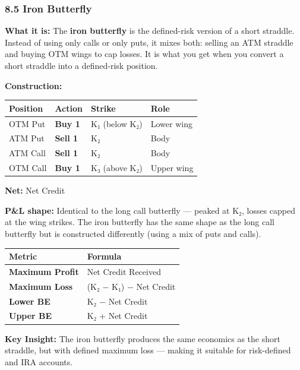 \documentclass[12pt,openany]{book}
\begin{document}
\subsubsection{8.5 Iron Butterfly}

\textbf{What it is:} The \textbf{iron butterfly} is the defined-risk version of a short straddle. Instead of using only calls or only puts, it mixes both: selling an ATM straddle and buying OTM wings to cap losses. It is what you get when you convert a short straddle into a defined-risk position.

\textbf{Construction:}

\begin{center}
\scriptsize
\setlength{\tabcolsep}{3pt}
\begin{tabular}{|L{3.31cm}|L{3.31cm}|L{3.31cm}|L{3.31cm}|}
\hline
Position & Action & Strike & Role \\
\hline
OTM Put & \textbf{Buy 1} & K₁ (below K₂) & Lower wing \\
\hline
ATM Put & \textbf{Sell 1} & K₂ & Body \\
\hline
ATM Call & \textbf{Sell 1} & K₂ & Body \\
\hline
OTM Call & \textbf{Buy 1} & K₃ (above K₂) & Upper wing \\
\hline
\end{tabular}
\end{center}

\textbf{Net:} Net Credit

\textbf{P\&L shape:} Identical to the long call butterfly — peaked at K₂, losses capped at the wing strikes. The iron butterfly has the same shape as the long call butterfly but is constructed differently (using a mix of puts and calls).

\begin{center}
\scriptsize
\setlength{\tabcolsep}{3pt}
\begin{tabular}{|L{6.00cm}|L{6.00cm}|}
\hline
Metric & Formula \\
\hline
\textbf{Maximum Profit} & Net Credit Received \\
\hline
\textbf{Maximum Loss} & (K₂ − K₁) − Net Credit \\
\hline
\textbf{Lower BE} & K₂ − Net Credit \\
\hline
\textbf{Upper BE} & K₂ + Net Credit \\
\hline
\end{tabular}
\end{center}

\textbf{Key Insight:} The iron butterfly produces the same economics as the short straddle, but with defined maximum loss — making it suitable for risk-defined and IRA accounts.
\end{document}

